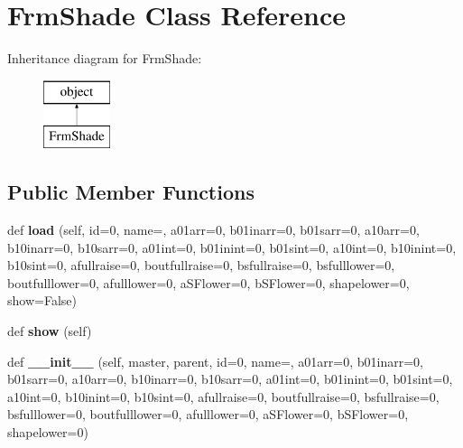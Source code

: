 \hypertarget{class_f_shade_1_1_frm_shade}{}\section{Frm\+Shade Class Reference}
\label{class_f_shade_1_1_frm_shade}
Inheritance diagram for Frm\+Shade\+:\begin{figure}[H]
\begin{center}
\leavevmode
\includegraphics[height=2.000000cm]{class_f_shade_1_1_frm_shade}
\end{center}
\end{figure}
\subsection*{Public Member Functions}
\begin{DoxyCompactItemize}
\item 
\mbox{\label{class_f_shade_1_1_frm_shade_abf03882231e5ddb36fa60b96c5001cd2}} 
def {\bfseries load} (self, id=0, name=\textquotesingle{}\textquotesingle{}, a01arr=0, b01inarr=0, b01sarr=0, a10arr=0, b10inarr=0, b10sarr=0, a01int=0, b01inint=0, b01sint=0, a10int=0, b10inint=0, b10sint=0, afullraise=0, boutfullraise=0, bsfullraise=0, bsfulllower=0, boutfulllower=0, afulllower=0, a\+S\+Flower=0, b\+S\+Flower=0, shapelower=0, show=False)
\item 
\mbox{\label{class_f_shade_1_1_frm_shade_ab4f4398c3f210fe4ea6e720401357691}} 
def {\bfseries show} (self)
\item 
\mbox{\label{class_f_shade_1_1_frm_shade_a2a7c017b71cb1ea5efc601d706ffb5d2}} 
def {\bfseries \+\_\+\+\_\+init\+\_\+\+\_\+} (self, master, parent, id=0, name=\textquotesingle{}\textquotesingle{}, a01arr=0, b01inarr=0, b01sarr=0, a10arr=0, b10inarr=0, b10sarr=0, a01int=0, b01inint=0, b01sint=0, a10int=0, b10inint=0, b10sint=0, afullraise=0, boutfullraise=0, bsfullraise=0, bsfulllower=0, boutfulllower=0, afulllower=0, a\+S\+Flower=0, b\+S\+Flower=0, shapelower=0)
\end{DoxyCompactItemize}
